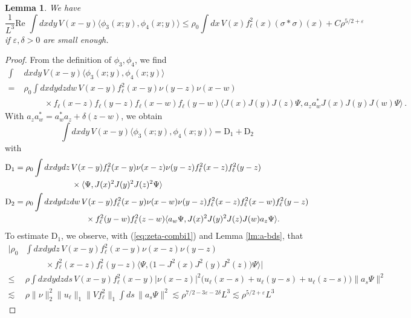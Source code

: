 \documentclass[a4paper,11pt]{article}
\def\eps{\varepsilon}
\newtheorem{lemma}[theorem]{Lemma}
\numberwithin{equation}{section}
\begin{document}
\begin{lemma} We have 
\[ \frac{1}{L^3} \text{Re } \int dx dy \, V(x-y) \langle \phi_3 (x;y) , \phi_4 (x;y) \rangle \leq \rho_0 \int dx \, V(x) f_\ell^2 (x) (\sigma* \sigma )( x) + C \rho^{5/2+\eps} \] if $\eps , \delta > 0$ are small enough. 
\end{lemma} 
\begin{proof} 
From the definition of $\phi_3, \phi_4$, we find 
\[ \begin{split}  \int \; &dx dy \, V(x-y) \langle \phi_3 (x;y) , \phi_4 (x;y) \rangle \\ =\;& \rho_0 \int dx dy dz dw \, V(x-y) f_\ell^2 (x-y) \nu (y-z) \nu (x-w) \\ &\hspace{1cm} \times  f_\ell(x-z) f_\ell(y-z) f_\ell(x-w) f_\ell(y-w) \langle J(x) J(y) J(z) \Psi , a_z a_w^* J(x) J(y) J(w) \Psi \rangle \,. \end{split} \]
With $a_z a_w^* = a_w^* a_z + \delta (z-w)$, we obtain 
\[  \int dx dy \, V(x-y) \langle \phi_3 (x;y) , \phi_4 (x;y) \rangle = \text{D}_1 + \text{D}_2 \]
with 
\[ \begin{split} \text{D}_1 =\;& \rho_0 \int dx dy dz \, V(x-y) f_\ell^2 (x-y) \nu (x-z) \nu (y-z) f_\ell^2(x-z) f_\ell^2(y-z)\\
&\hspace{2cm}\times  \langle \Psi, J(x)^2 J(y)^2 J(z)^2 \Psi \rangle  \\ 
\text{D}_2 =\;& \rho_0 \int dx dy dz dw \, V(x-y) f_\ell^2 (x-y) \nu (x-w) \nu (y-z) f_\ell^2 (x-z) f_\ell^2 (x-w) f_\ell^2 (y-z) \\
&\hspace{2.6cm} \times f_\ell^2 (y-w) f_\ell^2 (z-w) \langle a_w \Psi, J(x)^2 J(y)^2 J(z) J(w) a_z \Psi \rangle . \end{split} \]
To estimate $\text{D}_1$, we observe, with (\ref{eq:zeta-combi1}) and Lemma \ref{lm:a-bds}, that 
\[ \begin{split} 
\Big| \rho_0 &\int dx dy dz \, V(x-y) f_\ell^2 (x-y) \nu (x-z) \nu (y-z) \\
&\hspace{1cm}\times f_\ell^2(x-z) f_\ell^2(y-z)  \langle \Psi, \big( 1 - J^2 (x) J^2 (y) J^2 (z) \big) \Psi \rangle \Big| \\ \leq \; &
\rho \int dx dy dz ds \, V(x-y)f_\ell^2(x-y) |\nu (x-z)|^2 \big (u_\ell (x-s) + u_\ell (y-s) + u_\ell (z-s) \big) \| a_s \Psi \|^2 \\ \lesssim \; &\rho \| \nu \|_2^2 \| u_\ell \|_1 \|Vf_\ell^2\|_1\int ds \, \| a_s \Psi \|^2 \lesssim \rho^{7/2-3\eps-2\delta} L^3 \lesssim \rho^{5/2+\eps} L^3 \end{split} \]

\end{proof}
\end{document}
